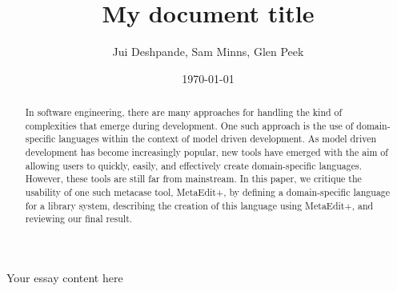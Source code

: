 \documentclass[12pt]{article}
\title{My document title}
\author{Jui Deshpande, Sam Minns, Glen Peek}
\date{\today}
\begin{document}
\maketitle
\begin{abstract}
In software engineering, there are many approaches for handling the kind of complexities that emerge during development.  One such approach is the use of domain-specific languages within the context of model driven development.  As model driven development has become increasingly popular, new tools have emerged with the aim of allowing users to quickly, easily, and effectively create domain-specific languages.  However, these tools are still far from mainstream.  In this paper, we critique the usability of one such metacase tool, MetaEdit+, by defining a domain-specific language for a library system, describing the creation of this language using MetaEdit+, and reviewing our final result.  
\end{abstract}
Your essay content here


\end{document}
